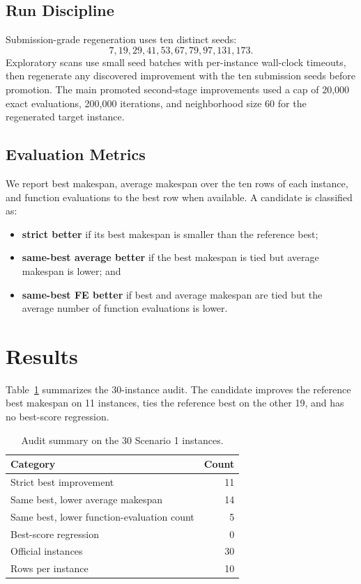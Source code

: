 \documentclass[sigconf,anonymous,review,dvipsnames]{acmart}
\begin{document}
\subsection{Run Discipline}
Submission-grade regeneration uses ten distinct seeds:
\[
7,19,29,41,53,67,79,97,131,173.
\]
Exploratory scans use small seed batches with per-instance wall-clock timeouts, then regenerate any discovered improvement with the ten submission seeds before promotion.
The main promoted second-stage improvements used a cap of 20,000 exact evaluations, 200,000 iterations, and neighborhood size 60 for the regenerated target instance.

\subsection{Evaluation Metrics}
We report best makespan, average makespan over the ten rows of each instance, and function evaluations to the best row when available.
A candidate is classified as:
\begin{itemize}
  \item \textbf{strict better} if its best makespan is smaller than the reference best;
  \item \textbf{same-best average better} if the best makespan is tied but average makespan is lower; and
  \item \textbf{same-best FE better} if best and average makespan are tied but the average number of function evaluations is lower.
\end{itemize}

\section{Results}
Table~\ref{tab:summary} summarizes the 30-instance audit.
The candidate improves the reference best makespan on 11 instances, ties the reference best on the other 19, and has no best-score regression.

\begin{table}[t]
  \centering
  \caption{Audit summary on the 30 Scenario 1 instances.}
  \label{tab:summary}
  \begin{tabular}{lr}
    \toprule
    Category & Count \\
    \midrule
    Strict best improvement & 11 \\
    Same best, lower average makespan & 14 \\
    Same best, lower function-evaluation count & 5 \\
    Best-score regression & 0 \\
    \midrule
    Official instances & 30 \\
    Rows per instance & 10 \\
    \bottomrule
  \end{tabular}
\end{table}
\end{document}
